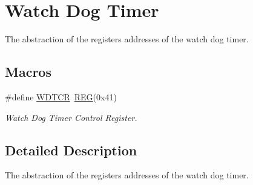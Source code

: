\hypertarget{group__WATCHDOGMCAL}{\section{Watch Dog Timer}
\label{group__WATCHDOGMCAL}
}


The abstraction of the registers addresses of the watch dog timer.  


\subsection*{Macros}
\begin{DoxyCompactItemize}
\item 
\hypertarget{group__WATCHDOGMCAL_ga4874892127ab7769a6a0602484f87aa2}{\#define \hyperlink{group__WATCHDOGMCAL_ga4874892127ab7769a6a0602484f87aa2}{W\+D\+T\+C\+R}~\hyperlink{group__MCAL_ga72e45020e46f285689db51c46f273403}{R\+E\+G}(0x41)}\label{group__WATCHDOGMCAL_ga4874892127ab7769a6a0602484f87aa2}

\begin{DoxyCompactList}\small\item\em Watch Dog Timer Control Register. \end{DoxyCompactList}\end{DoxyCompactItemize}


\subsection{Detailed Description}
The abstraction of the registers addresses of the watch dog timer. 

